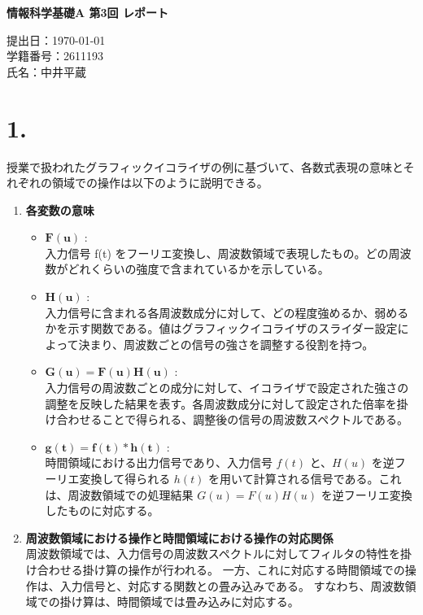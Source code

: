 \documentclass[11pt,a4paper]{jlreq}
\begin{document}
\begin{center}
{\LARGE \textbf{情報科学基礎A 第3回 レポート}}
\end{center}
\vspace{1em}

\begin{flushright}
提出日：\today \\
学籍番号：2611193 \\
氏名：中井平蔵
\end{flushright}
\section*{1.}

授業で扱われたグラフィックイコライザの例に基づいて、各数式表現の意味とそれぞれの領域での操作は以下のように説明できる。

\begin{enumerate}
    \item \textbf{各変数の意味}
    \begin{itemize}
        \item $\boldsymbol{F(u)}$ : \\
        入力信号 f(t) をフーリエ変換し、周波数領域で表現したもの。どの周波数がどれくらいの強度で含まれているかを示している。
        \item $\boldsymbol{H(u)}$ : \\
        入力信号に含まれる各周波数成分に対して、どの程度強めるか、弱めるかを示す関数である。値はグラフィックイコライザのスライダー設定によって決まり、周波数ごとの信号の強さを調整する役割を持つ。
        \item $\boldsymbol{G(u) = F(u)H(u)}$ : \\
        入力信号の周波数ごとの成分に対して、イコライザで設定された強さの調整を反映した結果を表す。各周波数成分に対して設定された倍率を掛け合わせることで得られる、調整後の信号の周波数スペクトルである。
        \item $\boldsymbol{g(t) = f(t) * h(t)}$ : \\
        時間領域における出力信号であり、入力信号 $f(t)$ と、$H(u)$ を逆フーリエ変換して得られる $h(t)$ を用いて計算される信号である。これは、周波数領域での処理結果 $G(u)=F(u)H(u)$ を逆フーリエ変換したものに対応する。
    \end{itemize}

    \item \textbf{周波数領域における操作と時間領域における操作の対応関係}\\
    周波数領域では、入力信号の周波数スペクトルに対してフィルタの特性を掛け合わせる掛け算の操作が行われる。
    一方、これに対応する時間領域での操作は、入力信号と、対応する関数との畳み込みである。
    すなわち、周波数領域での掛け算は、時間領域では畳み込みに対応する。
\end{enumerate}
\end{document}
